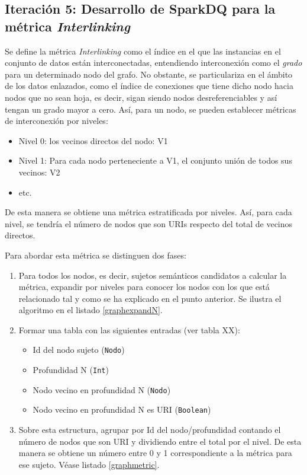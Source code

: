 \subsection{Iteración 5: Desarrollo de SparkDQ para la métrica \textit{Interlinking}}



Se define la métrica \textit{Interlinking} como el índice en el que las
instancias en el conjunto de datos están interconectadas, entendiendo
interconexión como el \textit{grado} para un determinado nodo del grafo. No
obstante, se particulariza en el ámbito de los datos enlazados, como el índice de
conexiones que tiene dicho nodo hacia nodos que no sean hoja, es decir, sigan
siendo nodos desreferenciables y así tengan un grado mayor a cero. Así,
para un nodo, se pueden establecer métricas de
interconexión por niveles:

\begin{itemize}
\item Nivel 0: los vecinos directos del nodo: V1 
\item Nivel 1: Para cada nodo perteneciente a V1, el conjunto unión de todos sus
  vecinos: V2
\item etc. 
\end{itemize}

De esta manera se obtiene una métrica estratificada por niveles. Así, para cada nivel, se
tendría el número de nodos que son URIs respecto del total de vecinos directos. 

Para abordar esta métrica se distinguen dos fases: 

\begin{enumerate}
\item Para todos los nodos, es decir, sujetos semánticos candidatos a calcular
  la métrica, expandir por niveles para conocer los nodos con los que está
  relacionado tal y como se ha explicado en el punto anterior. Se ilustra el
  algoritmo en el listado \ref{graphexpandN}. 

\item Formar una tabla con las siguientes entradas (ver tabla XX): 
  \begin{itemize}
  \item Id del nodo sujeto (\texttt{Nodo})
  \item Profundidad N (\texttt{Int})
  \item Nodo vecino en profundidad N (\texttt{Nodo})
  \item Nodo vecino en profundidad N es URI (\texttt{Boolean})
  \end{itemize}
\item Sobre esta estructura, agrupar por Id del nodo/profundidad contando el
  número de nodos que son URI y dividiendo entre el total por el nivel. De esta
  manera se obtiene un número entre 0 y 1 correspondiente a la métrica para ese
  sujeto. Véase listado \ref{graphmetric}.
\end{enumerate}

